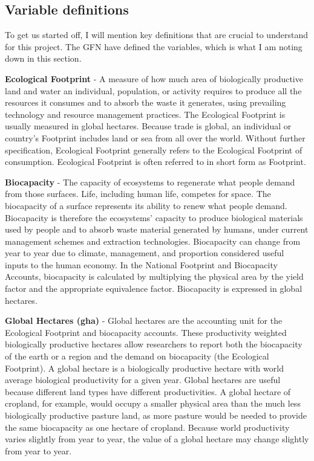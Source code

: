 \documentclass[
]{article}
\begin{document}
\hypertarget{variable-definitions}{%
\subsection{Variable definitions}\label{variable-definitions}}

To get us started off, I will mention key definitions that are crucial
to understand for this project. The GFN have defined the variables,
which is what I am noting down in this section.

\textbf{Ecological Footprint} - A measure of how much area of
biologically productive land and water an individual, population, or
activity requires to produce all the resources it consumes and to absorb
the waste it generates, using prevailing technology and resource
management practices. The Ecological Footprint is usually measured in
global hectares. Because trade is global, an individual or country's
Footprint includes land or sea from all over the world. Without further
specification, Ecological Footprint generally refers to the Ecological
Footprint of consumption. Ecological Footprint is often referred to in
short form as Footprint.

\textbf{Biocapacity} - The capacity of ecosystems to regenerate what
people demand from those surfaces. Life, including human life, competes
for space. The biocapacity of a surface represents its ability to renew
what people demand. Biocapacity is therefore the ecosystems' capacity to
produce biological materials used by people and to absorb waste material
generated by humans, under current management schemes and extraction
technologies. Biocapacity can change from year to year due to climate,
management, and proportion considered useful inputs to the human
economy. In the National Footprint and Biocapacity Accounts, biocapacity
is calculated by multiplying the physical area by the yield factor and
the appropriate equivalence factor. Biocapacity is expressed in global
hectares.

\textbf{Global Hectares (gha)} - Global hectares are the accounting unit
for the Ecological Footprint and biocapacity accounts. These
productivity weighted biologically productive hectares allow researchers
to report both the biocapacity of the earth or a region and the demand
on biocapacity (the Ecological Footprint). A global hectare is a
biologically productive hectare with world average biological
productivity for a given year. Global hectares are useful because
different land types have different productivities. A global hectare of
cropland, for example, would occupy a smaller physical area than the
much less biologically productive pasture land, as more pasture would be
needed to provide the same biocapacity as one hectare of cropland.
Because world productivity varies slightly from year to year, the value
of a global hectare may change slightly from year to year.
\end{document}
